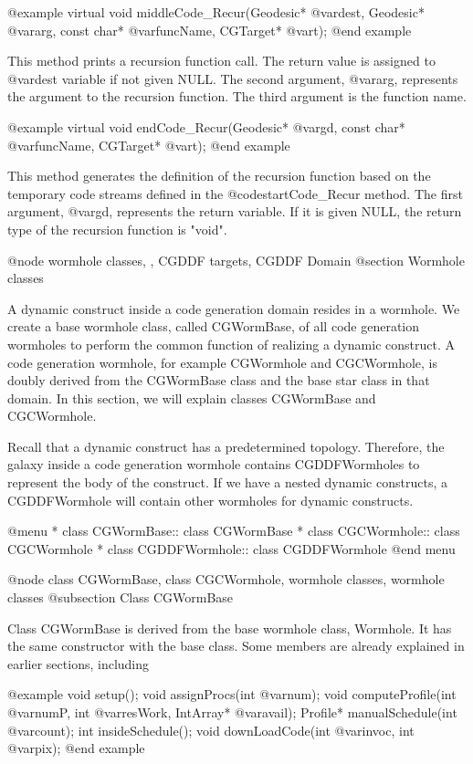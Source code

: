 {@example
virtual void middleCode_Recur(Geodesic* @var{dest}, Geodesic* @var{arg}, const char* @var{funcName}, CGTarget* @var{t});
@end example

This method prints a recursion function call. The return value is assigned
to @var{dest} variable if not given NULL. The second argument, @var{arg},
represents the argument to the recursion function. The third argument is
the function name.

@example
virtual void endCode_Recur(Geodesic* @var{gd}, const char* @var{funcName}, CGTarget* @var{t});
@end example

This method generates the definition of the recursion function based on
the temporary code streams defined in the @code{startCode_Recur} method.
The first argument, @var{gd}, represents the return variable. If it is given
NULL, the return type of the recursion function is "void".

@node wormhole classes, , CGDDF targets, CGDDF Domain
@section Wormhole classes

A dynamic construct inside a code generation domain resides in a
wormhole. We create a base wormhole class, called CGWormBase, of all
code generation wormholes to perform the common function of realizing a
dynamic construct. A code generation wormhole, for example CGWormhole and
CGCWormhole, is doubly derived from the CGWormBase class and the base
star class in that domain. In this section, we will explain classes
CGWormBase and CGCWormhole.

Recall that a dynamic construct has a predetermined topology. Therefore,
the galaxy inside a code generation wormhole contains CGDDFWormholes
to represent the body of the construct. If we have a nested dynamic
constructs, a CGDDFWormhole will contain other wormholes for dynamic
constructs.

@menu
* class CGWormBase::		class CGWormBase
* class CGCWormhole::		class CGCWormhole
* class CGDDFWormhole::		class CGDDFWormhole
@end menu

@node class CGWormBase, class CGCWormhole, wormhole classes, wormhole classes
@subsection Class CGWormBase

Class CGWormBase is derived from the base wormhole class, Wormhole. It has the
same constructor with the base class.
Some members are already explained in earlier sections, including

@example
void setup();
void assignProcs(int @var{num});
void computeProfile(int @var{numP}, int @var{resWork}, IntArray* @var{avail});
Profile* manualSchedule(int @var{count});
int insideSchedule();
void downLoadCode(int @var{invoc}, int @var{pix});
@end example

}
